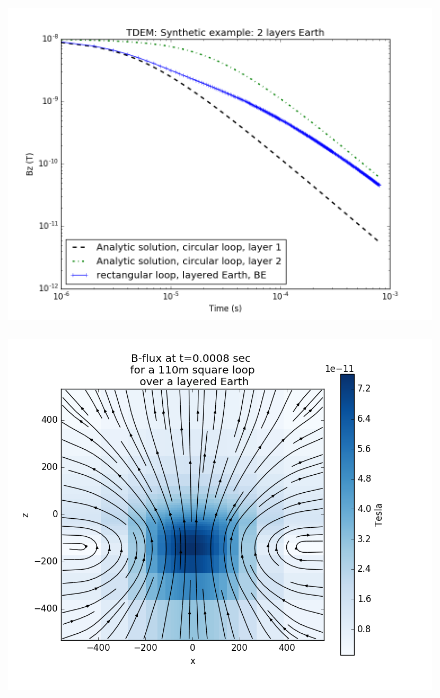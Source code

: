 \documentclass[twoside]{article}
\begin{document}
\begin{figure}[!ht]
\centering
\begin{minipage}{0.5\textwidth}
  \centering
  \includegraphics[width=\linewidth]{./figures/Examples/layerEarth_1em2_1em1p5_r55.png}
  \label{Layer_response}
\end{minipage}%
\begin{minipage}{.5\textwidth}
  \centering
  \includegraphics[width=\linewidth]{./figures/Examples/Field_layerEarth_1em2_1em1p5_r55.png}
  \label{Layer_eps}
\end{minipage}
\end{figure}
\end{document}
